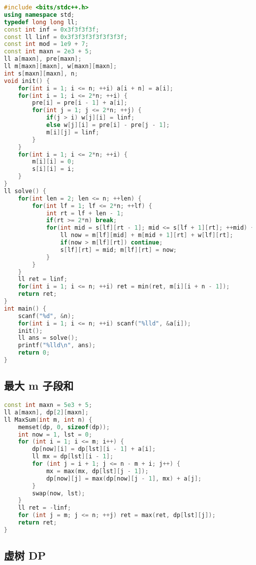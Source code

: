 \begin{lstlisting}[language=C++]
#include <bits/stdc++.h>
using namespace std;
typedef long long ll;
const int inf = 0x3f3f3f3f;
const ll linf = 0x3f3f3f3f3f3f3f3f;
const int mod = 1e9 + 7;
const int maxn = 2e3 + 5;
ll a[maxn], pre[maxn];
ll m[maxn][maxn], w[maxn][maxn];
int s[maxn][maxn], n;
void init() {
    for(int i = 1; i <= n; ++i) a[i + n] = a[i];
    for(int i = 1; i <= 2*n; ++i) {
        pre[i] = pre[i - 1] + a[i];
        for(int j = 1; j <= 2*n; ++j) {
            if(j > i) w[j][i] = linf;
            else w[j][i] = pre[i] - pre[j - 1];
            m[i][j] = linf;
        }
    }
    for(int i = 1; i <= 2*n; ++i) {
        m[i][i] = 0;
        s[i][i] = i;
    }
}
ll solve() {
    for(int len = 2; len <= n; ++len) {
        for(int lf = 1; lf <= 2*n; ++lf) {
            int rt = lf + len - 1;
            if(rt >= 2*n) break;
            for(int mid = s[lf][rt - 1]; mid <= s[lf + 1][rt]; ++mid) {
                ll now = m[lf][mid] + m[mid + 1][rt] + w[lf][rt];
                if(now > m[lf][rt]) continue;
                s[lf][rt] = mid; m[lf][rt] = now;
            }
        }
    }
    ll ret = linf;
    for(int i = 1; i <= n; ++i) ret = min(ret, m[i][i + n - 1]);
    return ret;
}
int main() {
    scanf("%d", &n);
    for(int i = 1; i <= n; ++i) scanf("%lld", &a[i]);
    init();
    ll ans = solve();
    printf("%lld\n", ans);
    return 0;
}
\end{lstlisting}

\subsection{最大 m 子段和}

\begin{lstlisting}[language=C++]
const int maxn = 5e3 + 5;
ll a[maxn], dp[2][maxn];
ll MaxSum(int m, int n) {
    memset(dp, 0, sizeof(dp));
    int now = 1, lst = 0;
    for (int i = 1; i <= m; i++) {
        dp[now][i] = dp[lst][i - 1] + a[i];
        ll mx = dp[lst][i - 1];
        for (int j = i + 1; j <= n - m + i; j++) {
            mx = max(mx, dp[lst][j - 1]);
            dp[now][j] = max(dp[now][j - 1], mx) + a[j];
        }
        swap(now, lst);
    }
    ll ret = -linf;
    for (int j = m; j <= n; ++j) ret = max(ret, dp[lst][j]);
    return ret;
}
\end{lstlisting}


\subsection{虚树 DP}

